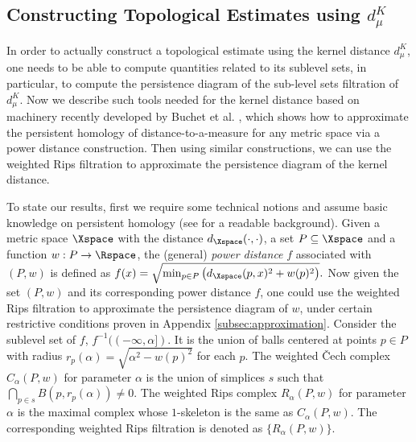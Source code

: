 \documentclass[11pt]{myclass}
\begin{document}
\subsection{Constructing Topological Estimates using $d^K_{\mu}$}
\label{subsec:topo-est}
In order to actually construct a topological estimate using the kernel distance $d^K_{\mu}$, one needs to be able to compute quantities related to its sublevel sets, in particular, to compute the persistence diagram of the sub-level sets filtration of $d^K_{\mu}$.  
Now we describe such tools needed for the kernel distance based on machinery recently developed by Buchet et al.  \cite{BuchetChazalOudot2013}, which shows how to approximate the persistent homology of distance-to-a-measure for any metric space via a power distance construction. Then using similar constructions, we can use the weighted Rips filtration to approximate the persistence diagram of the kernel distance. 

To state our results, first we require some technical notions and assume basic knowledge on persistent homology (see \cite{EdelsbrunnerHarer2008,EdelsbrunnerHarer2010} for a readable background). 
Given a metric space $\Xspace$ with the distance $d_{\Xspace}(\cdot, \cdot)$, a set $P \subseteq  \Xspace$ and a function $w: P \to \Rspace$, the (general) \emph{power distance} $f$ associated with $(P, w)$ is defined as 
$
f(x) = \sqrt{\min_{p \in P} \left( d_{\Xspace}(p,x)^2 + w(p)^2  \right)}.
$ 
Now given the set $(P,w)$ and its corresponding power distance $f$, one could use the weighted Rips filtration to approximate the persistence diagram of $w$, under certain restrictive conditions proven in Appendix \ref{subsec:approximation}.  
Consider the sublevel set of $f$, $f^{-1}((-\infty, \alpha])$. It is the union of balls centered at points $p \in P$ with radius $r_p(\alpha) = \sqrt{\alpha^2 - w(p)^2}$ for each $p$.
The weighted \v{C}ech complex $C_{\alpha}(P, w)$ for parameter $\alpha$ is the union of simplices $s$ such that $\bigcap_{p \in s} B(p, r_p(\alpha)) \neq 0$. 
The weighted Rips complex $R_{\alpha}(P, w)$ for parameter $\alpha$ is the maximal complex whose $1$-skeleton is the same as $C_{\alpha}(P, w)$.  
The corresponding weighted Rips filtration is denoted as $\{R_{\alpha}(P, w)\}$. 
\end{document}

